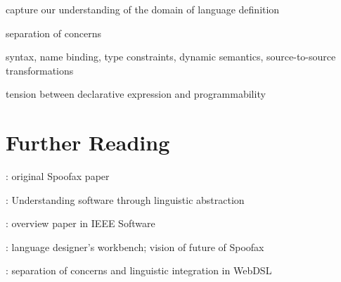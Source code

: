 capture our understanding of the domain of language definition

separation of concerns

syntax, name binding, type constraints, dynamic semantics, source-to-source
transformations


tension between declarative expression and programmability

\section{Further Reading}

\cite{KatsV10}: original Spoofax paper

\cite{Visser15}: Understanding software through linguistic abstraction

\cite{WachsmuthKV14}: overview paper in IEEE Software

\cite{VisserOnward14}: language designer's workbench; vision of future of
Spoofax

\cite{GroenewegenHV10}: separation of concerns and linguistic integration in
WebDSL \cite{Visser07}




